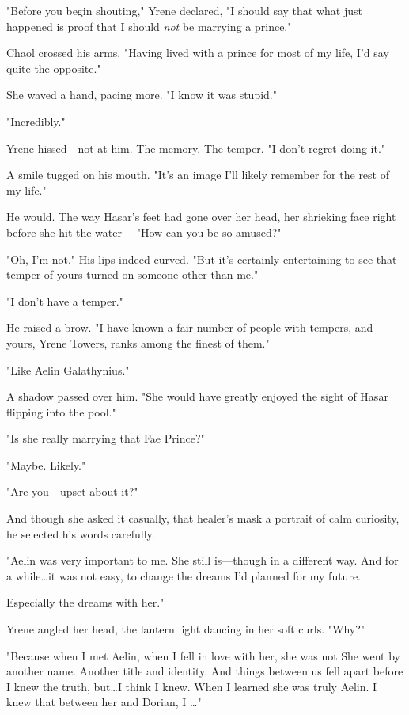 "Before you begin shouting," Yrene declared, "I should say that what just happened is proof that I should \emph{not} be marrying a prince."

Chaol crossed his arms.
"Having lived with a prince for most of my life, I'd say quite the opposite."

She waved a hand, pacing more.
"I know it was stupid."

"Incredibly."

Yrene hissed---not at him.
The memory.
The temper.
"I don't regret doing it."

A smile tugged on his mouth.
"It's an image I'll likely remember for the rest of my life."

He would.
The way Hasar's feet had gone over her head, her shrieking face right before she hit the water--- "How can you be so amused?"

"Oh, I'm not."
His lips indeed curved.
"But it's certainly entertaining to see that temper of yours turned on someone other than me."

"I don't have a temper."

He raised a brow.
"I have known a fair number of people with tempers, and yours, Yrene Towers, ranks among the finest of them."

"Like Aelin Galathynius."

A shadow passed over him.
"She would have greatly enjoyed the sight of Hasar flipping into the pool."

"Is she really marrying that Fae Prince?"

"Maybe.
Likely."

"Are you---upset about it?"

And though she asked it casually, that healer's mask a portrait of calm curiosity, he selected his words carefully.

"Aelin was very important to me.
She still is---though in a different way.
And for a while\ldots it was not easy, to change the dreams I'd planned for my future.

Especially the dreams with her."

Yrene angled her head, the lantern light dancing in her soft curls.
"Why?"

"Because when I met Aelin, when I fell in love with her, she was not  She went by another name.
Another title and identity.
And things between us fell apart before I knew the truth, but\ldots I think I knew.
When I learned she was truly Aelin.
I knew that between her and Dorian, I \ldots"

